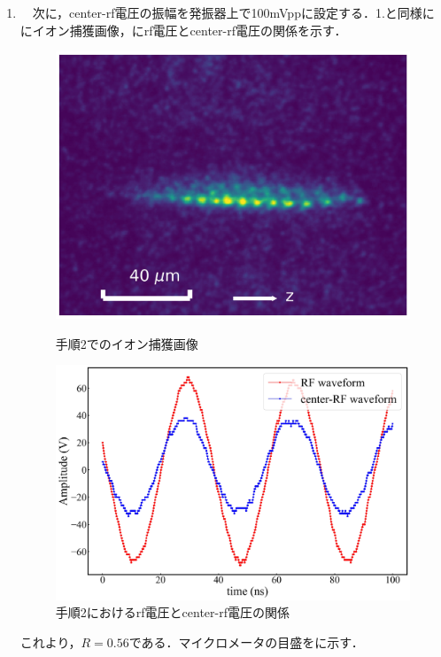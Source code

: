 \begin{enumerate}
\item　次に，center-rf電圧の振幅を発振器上で100mVppに設定する．1.と同様ににイオン捕獲画像，にrf電圧とcenter-rf電圧の関係を示す．\\
%
\clearpage
%
\begin{figure}[h]
	\begin{minipage}{0.48\linewidth}
	\begin{center}
		\includegraphics[width = 0.6\columnwidth]{./methods/figure/2_2D.jpg}
		\caption{手順2でのイオン捕獲画像}
		\label{fig:2_2D}
	\end{center}
	\end{minipage}
	\begin{minipage}{0.48\linewidth}
		\begin{center}
			\includegraphics[width = 0.9\columnwidth]{./methods/figure/2_2D_wave.jpg}
			\caption{手順2におけるrf電圧とcenter-rf電圧の関係}
			\label{fig:2_2D_wave}
		\end{center}
	\end{minipage}
\end{figure}

これより，$R=0.56$である．マイクロメータの目盛をに示す．


\end{enumerate}
